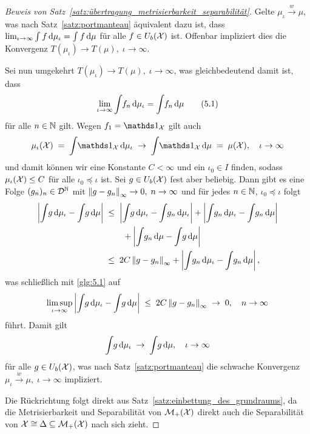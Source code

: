 \documentclass[../thesis/thesis.tex]{subfiles}
\begin{document}
\begin{proof}[Beweis von Satz~\ref{satz:übertragung_metrisierbarkeit_separabilität}]
		Gelte $\mu_\iota \xrightarrow{w} \mu$, was nach Satz~\ref{satz:portmanteau} äquivalent dazu ist, dass $\lim_{\iota \to \infty} \int_{} \, f \, \mathrm{d}\mu_\iota = \int_{} \, f \, \mathrm{d}\mu$ für alle 
		$f \in U_b(\mathcal{X})$ ist. Offenbar impliziert dies die Konvergenz $T(\mu_\iota) \to T(\mu), \; \iota \to \infty$.
		
		Sei nun umgekehrt $T(\mu_\iota) \to T(\mu), \; \iota \to \infty$, was gleichbedeutend damit ist, dass 
		\[ \lim_{\iota \to \infty} \int_{} \, f_n \, \mathrm{d}\mu_\iota = \int_{} \, f_n \, \mathrm{d}\mu \label{glg:5.1} \tag{5.1} \] 
		für alle $n \in \mathbb{N}$ gilt.
		Wegen $f_1 = \indfct_\X$ gilt auch
		\[ \mu_\iota(\X) \; = \; \measureint{}{\indfct_\X}{\mu_\iota} \; \to \; \measureint{}{\indfct_\X}{\mu} \; = \; \mu(\X), \quad \iota \to \infty \]
		und damit können wir eine Konstante $C < \infty$ und ein $\iota_0 \in I$ finden, sodass $\mu_\iota(\mathcal{X}) \leq C$ für alle $\iota_0 \preceq \iota$ ist.
		Sei $g \in U_b(\mathcal{X})$ fest aber beliebig. Dann gibt es eine Folge $(g_n)_n \in \mathcal{D}^{\mathbb{N}}$ mit $\left\lVert g - g_n\right\rVert_\infty \to 0, \; n \to \infty$ und für jedes $n \in \mathbb{N}$, $\iota_0 \preceq \iota$ folgt
		\begin{align*}
			\left| \int_{} \, g \, \mathrm{d}\mu_\iota - \int_{} \, g \, \mathrm{d}\mu \right| \; &\leq \; 
			\left| \int_{} \, g \, \mathrm{d}\mu_\iota - \int_{} \, g_n \, \mathrm{d}\mu_\iota \right| + 
			\left| \int_{} \, g_n \, \mathrm{d}\mu_\iota - \int_{} \, g_n \, \mathrm{d}\mu \right| \\
			& \qquad + 
			\left| \int_{} \, g_n \, \mathrm{d}\mu - \int_{} \, g \, \mathrm{d}\mu \right| \\
			&\leq \; 2 C \left\lVert g - g_n\right\rVert_\infty + \left| \int_{} \, g_n \, \mathrm{d}\mu_\iota - 
			\int_{} \, g_n \, \mathrm{d}\mu \right| \text{,}
		\end{align*}
		was schließlich mit \eqref{glg:5.1} auf
		\[ \limsup_{\iota \to \infty} \left| \int_{} \, g \, \mathrm{d}\mu_\iota - \int_{} \, g \, \mathrm{d}\mu \right| \; \leq \; 2 C \left\lVert g - g_n\right\rVert_\infty \; \to \; 0, \quad n \to \infty \]
		führt. Damit gilt 
		\[ \int_{} \, g \, \mathrm{d}\mu_\iota \; \to \; \int_{} \, g \, \mathrm{d}\mu, \quad \iota \to \infty \]
		für alle $g \in U_b(\mathcal{X})$, was nach Satz~\ref{satz:portmanteau} die schwache Konvergenz $\mu_\iota \xrightarrow{w} \mu, \; \iota \to \infty$ impliziert.
		
		Die Rückrichtung folgt direkt aus Satz~\ref{satz:einbettung_des_grundraums}, da die Metrisierbarkeit und Separabilität von $\mathcal{M}_{+}(\mathcal{X})$ direkt auch die Separabilität von $\mathcal{X} \cong \Delta \subseteq \mathcal{M}_{+}(\mathcal{X})$ nach sich zieht.
	\end{proof}
\end{document}
